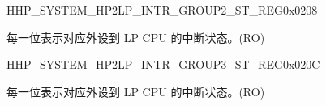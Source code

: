 {\begin{register}{H}{HP\_SYSTEM\_HP2LP\_INTR\_GROUP2\_ST\_REG}{0x0208}\label{regdesc:HPSYSTEMHP2LPINTRGROUP2STREG}
%
\regnewline%
\begin{regdesc}\begin{reglist}
\label{fielddesc:HPSYSTEMH2LPINTRGROUP2ST}\item [HP\_SYSTEM\_H2LP\_INTR\_GROUP2\_ST] 每一位表示对应外设到 LP CPU 的中断状态。(RO)
\end{reglist}\end{regdesc}
\end{register}


\begin{register}{H}{HP\_SYSTEM\_HP2LP\_INTR\_GROUP3\_ST\_REG}{0x020C}\label{regdesc:HPSYSTEMHP2LPINTRGROUP3STREG}
%
%
\regnewline%
\begin{regdesc}\begin{reglist}
\label{fielddesc:HPSYSTEMH2LPINTRGROUP3ST}\item [HP\_SYSTEM\_H2LP\_INTR\_GROUP3\_ST] 每一位表示对应外设到 LP CPU 的中断状态。(RO)
\end{reglist}\end{regdesc}
\end{register}

}